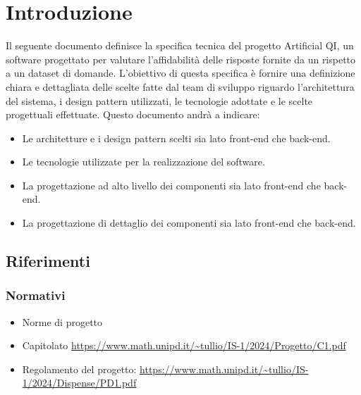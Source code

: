 \section{Introduzione}
\label{sec:introduzione_st}
Il seguente documento definisce la specifica tecnica del progetto Artificial QI, un software progettato per valutare l'affidabilità 
delle risposte fornite da un  rispetto a un dataset di domande.  L'obiettivo di questa specifica è fornire una 
definizione chiara e dettagliata delle scelte fatte dal team di sviluppo riguardo l'architettura del sistema, i design pattern 
utilizzati, le tecnologie adottate e le scelte progettuali effettuate.
Questo documento andrà a indicare:
\begin{itemize}
    \item Le architetture e i design pattern scelti sia lato front-end che back-end.
    \item Le tecnologie utilizzate per la realizzazione del software.
    \item La progettazione ad alto livello dei componenti sia lato front-end che back-end.
    \item La progettazione di dettaglio dei componenti sia lato front-end che back-end.
\end{itemize}



\subsection{Riferimenti}
\subsubsection{Normativi}
\begin{itemize}
    \item Norme di progetto
    \item Capitolato \url{https://www.math.unipd.it/~tullio/IS-1/2024/Progetto/C1.pdf}
    \item Regolamento del progetto: \url{https://www.math.unipd.it/~tullio/IS-1/2024/Dispense/PD1.pdf}
\end{itemize}
